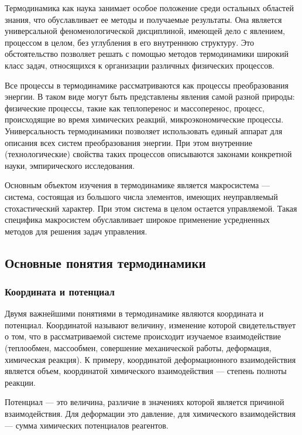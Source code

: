 \documentclass{article}
\begin{document}
	Термодинамика как наука занимает особое положение среди остальных областей знания, что обуславливает ее методы и получаемые результаты. Она является универсальной феноменологической дисциплиной, имеющей дело с явлением, процессом в целом, без углубления в его внутреннюю структуру. Это обстоятельство позволяет решать с помощью методов термодинамики широкий класс задач, относящихся к организации различных физических процессов.
	
	Все процессы в термодинамике рассматриваются как процессы преобразования энергии. В таком виде могут быть представлены явления самой разной природы: физические процессы, такие как теплоперенос и массоперенос, процесс, происходящие во время химических реакций, микроэкономические процессы. Универсальность термодинамики позволяет использовать единый аппарат для описания всех систем преобразования энергии. При этом внутренние (технологические) свойства таких процессов описываются законами конкретной науки, эмпирического исследования.
	
	Основным объектом изучения в термодинамике является макросистема --- система, состоящая из большого числа элементов, имеющих неуправляемый стохастический характер. При этом система в целом остается управляемой. Такая специфика макросистем обуславливает широкое применение усредненных методов для решения задач управления.

	\subsection{Основные понятия термодинамики}
	
	\subsubsection{Координата и потенциал}
	
	Двумя важнейшими понятиями в термодинамике являются координата и потенциал. Координатой называют величину, изменение которой свидетельствует о том, что в рассматриваемой системе происходит изучаемое взаимодействие (теплообмен, массообмен, совершение механической работы, деформация, химическая реакция). К примеру, координатой деформационного взаимодействия является объем, координатой химического взаимодействия --- степень полноты реакции.
	
	Потенциал --- это величина, различие в значениях которой является причиной взаимодействия. Для деформации это давление, для химического взаимодействия --- сумма химических потенциалов реагентов.
	
\end{document}
